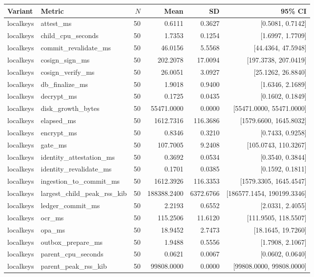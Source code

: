 \begin{tabular}{llrrrr}
Variant & Metric & $N$ & Mean & SD & 95\% CI \\
\hline
localkeys & attest\_ms & 50 & 0.6111 & 0.3627 & [0.5081, 0.7142] \\
localkeys & child\_cpu\_seconds & 50 & 1.7353 & 0.1254 & [1.6997, 1.7709] \\
localkeys & commit\_revalidate\_ms & 50 & 46.0156 & 5.5568 & [44.4364, 47.5948] \\
localkeys & cosign\_sign\_ms & 50 & 202.2078 & 17.0094 & [197.3738, 207.0419] \\
localkeys & cosign\_verify\_ms & 50 & 26.0051 & 3.0927 & [25.1262, 26.8840] \\
localkeys & db\_finalize\_ms & 50 & 1.9018 & 0.9400 & [1.6346, 2.1689] \\
localkeys & decrypt\_ms & 50 & 0.1725 & 0.0435 & [0.1602, 0.1849] \\
localkeys & disk\_growth\_bytes & 50 & 55471.0000 & 0.0000 & [55471.0000, 55471.0000] \\
localkeys & elapsed\_ms & 50 & 1612.7316 & 116.3686 & [1579.6600, 1645.8032] \\
localkeys & encrypt\_ms & 50 & 0.8346 & 0.3210 & [0.7433, 0.9258] \\
localkeys & gate\_ms & 50 & 107.7005 & 9.2408 & [105.0743, 110.3267] \\
localkeys & identity\_attestation\_ms & 50 & 0.3692 & 0.0534 & [0.3540, 0.3844] \\
localkeys & identity\_revalidate\_ms & 50 & 0.1701 & 0.0385 & [0.1592, 0.1811] \\
localkeys & ingestion\_to\_commit\_ms & 50 & 1612.3926 & 116.3353 & [1579.3305, 1645.4547] \\
localkeys & largest\_child\_peak\_rss\_kib & 50 & 188388.2400 & 6372.6766 & [186577.1454, 190199.3346] \\
localkeys & ledger\_commit\_ms & 50 & 2.2193 & 0.6552 & [2.0331, 2.4055] \\
localkeys & ocr\_ms & 50 & 115.2506 & 11.6120 & [111.9505, 118.5507] \\
localkeys & opa\_ms & 50 & 18.9452 & 2.7473 & [18.1645, 19.7260] \\
localkeys & outbox\_prepare\_ms & 50 & 1.9488 & 0.5556 & [1.7908, 2.1067] \\
localkeys & parent\_cpu\_seconds & 50 & 0.0621 & 0.0067 & [0.0602, 0.0640] \\
localkeys & parent\_peak\_rss\_kib & 50 & 99808.0000 & 0.0000 & [99808.0000, 99808.0000] \\

\end{tabular}
